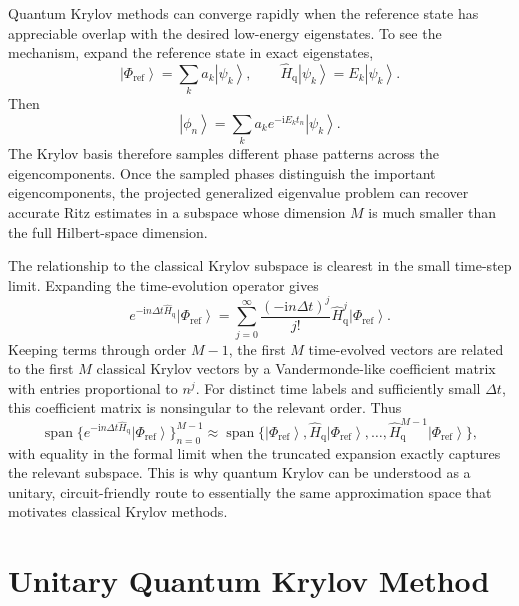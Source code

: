 \documentclass[11pt]{article}
\newcommand{\ii}{\mathrm{i}}
\newcommand{\ket}[1]{\left|#1\right\rangle}
\begin{document}
Quantum Krylov methods can converge rapidly when the reference state has appreciable overlap with the desired low-energy eigenstates.  To see the mechanism, expand the reference state in exact eigenstates,
\begin{equation}
    \ket{\Phi_{\mathrm{ref}}}=\sum_k a_k\ket{\psi_k},
    \qquad
    \hat{H}_{\mathrm{q}}\ket{\psi_k}=E_k\ket{\psi_k}.
\end{equation}
Then
\begin{equation}
    \ket{\phi_n}=\sum_k a_k e^{-\ii E_k t_n}\ket{\psi_k}.
\end{equation}
The Krylov basis therefore samples different phase patterns across the eigencomponents.  Once the sampled phases distinguish the important eigencomponents, the projected generalized eigenvalue problem can recover accurate Ritz estimates in a subspace whose dimension $M$ is much smaller than the full Hilbert-space dimension.

The relationship to the classical Krylov subspace is clearest in the small time-step limit.  Expanding the time-evolution operator gives
\begin{equation}
    e^{-\ii n\Delta t\hat{H}_{\mathrm{q}}}\ket{\Phi_{\mathrm{ref}}}
    = \sum_{j=0}^{\infty}\frac{(-\ii n\Delta t)^j}{j!}
    \hat{H}_{\mathrm{q}}^j\ket{\Phi_{\mathrm{ref}}}.
\end{equation}
Keeping terms through order $M-1$, the first $M$ time-evolved vectors are related to the first $M$ classical Krylov vectors by a Vandermonde-like coefficient matrix with entries proportional to $n^j$.  For distinct time labels and sufficiently small $\Delta t$, this coefficient matrix is nonsingular to the relevant order.  Thus
\begin{equation}
    \operatorname{span}\{e^{-\ii n\Delta t\hat{H}_{\mathrm{q}}}\ket{\Phi_{\mathrm{ref}}}\}_{n=0}^{M-1}
    \approx
    \operatorname{span}\{\ket{\Phi_{\mathrm{ref}}},\hat{H}_{\mathrm{q}}\ket{\Phi_{\mathrm{ref}}},\ldots,
    \hat{H}_{\mathrm{q}}^{M-1}\ket{\Phi_{\mathrm{ref}}}\},
\end{equation}
with equality in the formal limit when the truncated expansion exactly captures the relevant subspace.  This is why quantum Krylov can be understood as a unitary, circuit-friendly route to essentially the same approximation space that motivates classical Krylov methods.

\section{Unitary Quantum Krylov Method}
\end{document}
